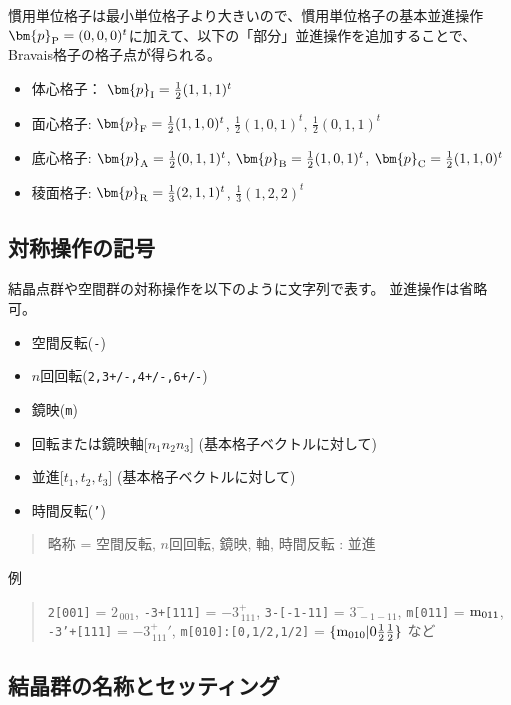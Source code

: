 \documentclass[11pt]{easymemo}
\begin{document}
慣用単位格子は最小単位格子より大きいので、慣用単位格子の基本並進操作$\bm{p}_{\rm P}=(0,0,0)^{t}$に加えて、以下の「部分」並進操作を追加することで、Bravais格子の格子点が得られる。
\begin{itemize}
  \item 体心格子： $\bm{p}_{\rm I}=\frac{1}{2}(1,1,1)^{t}$
  \item 面心格子: $\bm{p}_{\rm F}=\frac{1}{2}(1,1,0)^{t}$, $\frac{1}{2}(1,0,1)^{t}$, $\frac{1}{2}(0,1,1)^{t}$
  \item 底心格子: $\bm{p}_{\rm A}=\frac{1}{2}(0,1,1)^{t}$, $\bm{p}_{\rm B}=\frac{1}{2}(1,0,1)^{t}$, $\bm{p}_{\rm C}=\frac{1}{2}(1,1,0)^{t}$
  \item 稜面格子: $\bm{p}_{\rm R}=\frac{1}{3}(2,1,1)^{t}$, $\frac{1}{3}(1,2,2)^{t}$
\end{itemize}



\subsection{対称操作の記号}

結晶点群や空間群の対称操作を以下のように文字列で表す。
並進操作は省略可。
\begin{itemize}
  \item 空間反転({\tt -})
  \item $n$回回転({\tt 2,3+/-,4+/-,6+/-})
  \item 鏡映({\tt m})
  \item 回転または鏡映軸[$n_1n_2n_3$] (基本格子ベクトルに対して)
  \item 並進[$t_1,t_2,t_3$] (基本格子ベクトルに対して)
  \item 時間反転({\tt '})
\end{itemize}
\begin{quote}
  略称 = 空間反転, $n$回回転, 鏡映, 軸, 時間反転 : 並進
\end{quote}

例
\begin{quote}
  \texttt{2[001]} = $2_{\,001}$,\quad
  \texttt{-3+[111]} = $-3^+_{\,111}$,\quad
  \texttt{3-[-1-11]} = $3^-_{\,-1-11}$,\quad
  \texttt{m[011]} = ${\rm m}_{011}$,\\
  \texttt{-3'+[111]} = $-3^+_{\,111}{}'$,\quad
  \texttt{m[010]:[0,1/2,1/2]} = $\{{\rm m}_{010}|0 \frac{1}{2} \frac{1}{2}\}$ など
\end{quote}


\subsection{結晶群の名称とセッティング}
\end{document}
